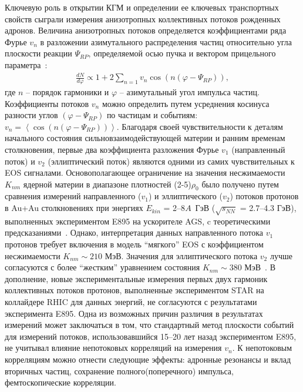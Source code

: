 Ключевую роль в открытии  КГМ  и  определении ее ключевых транспортных свойств сыграли измерения анизотропных коллективных потоков рожденных адронов. 
Величина анизотропных потоков определяется коэффициентами ряда Фурье $v_n$ в разложении азимутального распределения частиц относительно угла плоскости реакции $\Psi_{RP}$, определяемой осью пучка и вектором прицельного параметра~\cite{Voloshin:2008dg}:
\begin{eqnarray}
   \frac{dN}{d\varphi} \propto 1 + 2 \sum_{n=1} v_n \cos\left( n \left( \varphi - \Psi_{RP} \right) \right),
\end{eqnarray}
%
где $n$ -- порядок гармоники и  $\varphi$ -- азимутальный угол импульса частиц.
Коэффициенты потоков  $v_n$ можно определить путем усреднения косинуса разности углов  $\left( \varphi - \Psi_{RP} \right)$ по частицам и событиям: $v_n=\left\langle \cos\left( n \left( \varphi - \Psi_{RP} \right) \right) \right\rangle$.
Благодаря своей чувствительности к деталям начального состояния сильновзаимодействующей материи и ранним временам столкновения, первые два коэффициента разложения Фурье $v_1$ (направленный поток) и $v_2$ (эллиптический поток) являются одними из самих чувствительных к EOS сигналами.
Основополагающее ограничение на значения несжимаемости $K_{nm}$ ядерной материи  в диапазоне плотностей (2-5)$\rho_{0}$ было получено путем сравнения измерений направленного ($v_1$) и эллиптического ($v_2$)  потоков  протонов в Au+Au столкновениях при энергиях  $E_{kin}$ = 2--8$A$~ГэВ ($\sqrt{s_{NN}}$ = 2.7--4.3 ГэВ), выполненных экспериментом E895 на ускорителе AGS, c теоретическими предсказаниями~\cite{E895:1999ldn,E895:2000maf,E895:2001axb}. 
Однако, интерпретация данных направленного потока $v_1$ протонов требует включения в модель ``мягкого'' EOS с коэффициентом несжимаемости $K_{nm} \sim 210$ МэВ. 
Значения  для эллиптического потока $v_2$ лучше согласуются с более ``жестким'' уравнением состояния $K_{nm} \sim 380$ МэВ~\cite{Danielewicz:2002pu}. 
В дополнение, новые экспериментальные измерения первых двух гармоник коллективных потоков протонов, выполненные экспериментом  STAR на коллайдере RHIC для данных энергий, не согласуются с результатами эксперимента E895. Одна из возможных причин различия в результатах измерений может заключаться в том, что стандартный метод плоскости событий для измерений потоков, использовавшийся 15–20 лет назад экспериментом E895, не учитывал влияние непотоковых корреляций  на измерения $v_n$. 
К непотоковым корреляциям можно отнести следующие эффекты: адронные резонансы и вклад вторичных частиц, сохранение полного(поперечного) импульса, фемтоскопические корреляции. 
